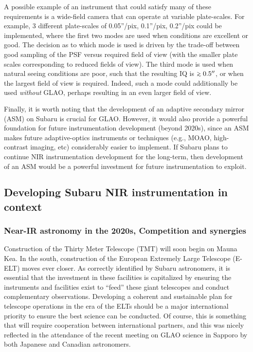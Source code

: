 A possible example of an instrument that could satisfy many of these
requirements is a wide-field camera that can operate at variable
plate-scales. For example, 3 different plate-scales of 0.05''/pix,
0.1''/pix, 0.2''/pix could be implemented, where the first two modes are
used when conditions are excellent or good. The decision as to which
mode is used is driven by the trade-off between good sampling of the PSF
versus required field of view (with the smaller plate scales
corresponding to reduced fields of view). The third mode is used when
natural seeing conditions are poor, such that the resulting IQ is
$\gsim 0.5''$, or when the largest field of view is required. Indeed,
such a mode could additionally be used {\it without} GLAO, perhaps
resulting in an even larger field of view.

Finally, it is worth noting that the development of an adaptive
secondary mirror (ASM) on Subaru is crucial for GLAO. However, it would
also provide a powerful foundation for future instrumentation
development (beyond 2020s), since an ASM makes future adaptive-optics
instruments or techniques (e.g., MOAO, high-contrast imaging, etc)
considerably easier to implement. If Subaru plans to continue NIR
instrumentation development for the long-term, then development of an
ASM would be a powerful investment for future instrumentation to
exploit. 

\subsection{Developing Subaru NIR instrumentation in context}

\subsubsection{Near-IR astronomy in the 2020s, Competition and synergies}

Construction of the Thirty Meter Telescope (TMT) will soon begin on
Mauna Kea. In the south, construction of the European Extremely Large
Telescope (E-ELT) moves ever closer. As correctly identified by Subaru
astronomers, it is essential that the investment in these facilities is
capitalized by ensuring the instruments and facilities exist to ``feed''
these giant telescopes and conduct complementary
observations. Developing a coherent and sustainable plan for telescope
operations in the era of the ELTs should be a major international
priority to ensure the best science can be conducted. Of course, this is
something that will require cooperation between international partners,
and this was nicely reflected in the attendance of the recent meeting on
GLAO science in Sapporo by both Japanese and Canadian astronomers. 

